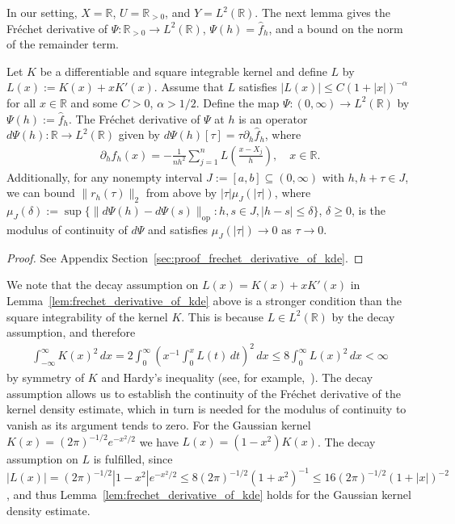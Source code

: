 In our setting, $X=\mathbb{R}$, $U=\mathbb{R}_{>0}$, and $Y=L^2(\mathbb{R})$. The next lemma gives the Fréchet derivative of $\Psi:\mathbb{R}_{>0}\to L^2(\mathbb{R})$, $\Psi(h)=\hat{f}_h$, and a bound on the norm of the remainder term.

\begin{Lem}\label{lem:frechet_derivative_of_kde}
    Let $K$ be a differentiable and square integrable kernel and define $L$ by $L(x):=K(x)+xK'(x)$. Assume that $L$ satisfies $|L(x)|\le C(1+|x|)^{-\alpha}$ for all $x\in\mathbb{R}$ and some $C>0$, $\alpha>1/2$. Define the map $\Psi:(0,\infty)\to L^2(\mathbb{R})$ by $\Psi(h):=\hat{f}_h$. The Fréchet derivative of $\Psi$ at $h$ is an operator $d\Psi(h):\mathbb{R}\to L^2(\mathbb{R})$ given by $d\Psi(h)[\tau]=\tau\partial_h\hat{f}_h$, where
    \begin{align}\label{eq:frechet_derivative_kde_formula}
        \partial_h\hat{f}_h(x)=-\frac{1}{nh^2}\sum_{j=1}^nL\left(\frac{x-X_j}{h}\right),\quad x\in\mathbb{R}.
    \end{align}
    Additionally, for any nonempty interval $J:=[a,b]\subseteq(0,\infty)$ with $h,h+\tau\in J$, we can bound $\|r_h(\tau)\|_2$ from above by $|\tau|\mu_J(|\tau|)$, where $\mu_J(\delta):=\sup\{\|d\Psi(h)-d\Psi(s)\|_{\operatorname{op}}:h,s\in J,|h-s|\le\delta\}$, $\delta\ge0$, is the modulus of continuity of $d\Psi$ and satisfies $\mu_J(|\tau|)\to0$ as $\tau\to0$. 
\end{Lem}

\begin{proof}
    See Appendix Section~\ref{sec:proof_frechet_derivative_of_kde}.
\end{proof}

\begin{Rem}\label{rem:gaussian_kernel_satisfies_decay_assumption}
    We note that the decay assumption on $L(x)=K(x)+xK'(x)$ in Lemma~\ref{lem:frechet_derivative_of_kde} above is a stronger condition than the square integrability of the kernel $K$. This is because $L\in L^2(\mathbb{R})$ by the decay assumption, and therefore
    \begin{align*}
        \int_{-\infty}^{\infty}K(x)^2\,dx=2\int_0^{\infty}\left(x^{-1}\int_0^xL(t)\,dt\right)^2\,dx\le 8\int_0^{\infty}L(x)^2\,dx<\infty
    \end{align*}
    by symmetry of $K$ and Hardy's inequality (see, for example,~\cite[Theorem~1]{beesack_hardys_1961}). The decay assumption allows us to establish the continuity of the Fréchet derivative of the kernel density estimate, which in turn is needed for the modulus of continuity to vanish as its argument tends to zero. For the Gaussian kernel $K(x)=(2\pi)^{-1/2}e^{-x^2/2}$ we have $L(x)=(1-x^2)K(x)$. The decay assumption on $L$ is fulfilled, since $|L(x)|=(2\pi)^{-1/2}|1-x^2|e^{-x^2/2}\le8(2\pi)^{-1/2}(1+x^2)^{-1}\le16(2\pi)^{-1/2}(1+|x|)^{-2}$, and thus Lemma~\ref{lem:frechet_derivative_of_kde} holds for the Gaussian kernel density estimate.
\end{Rem}

